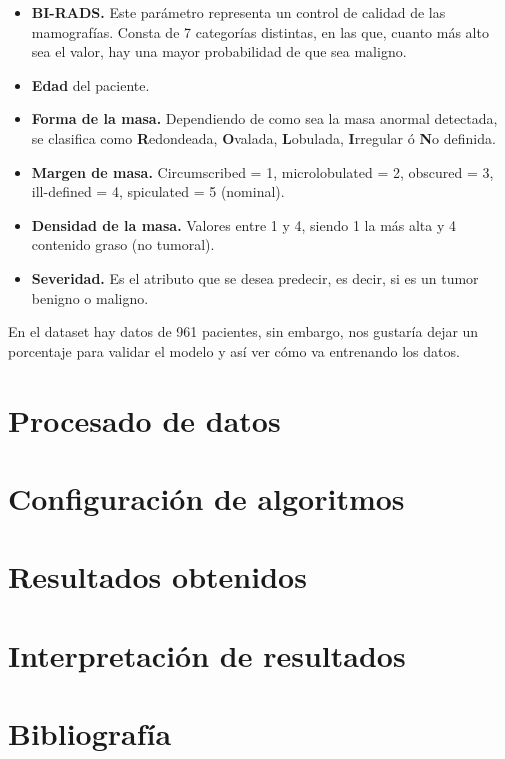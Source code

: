 \documentclass[11pt,a4paper]{article}
\begin{document}
\begin{itemize}
	\item \textbf{BI-RADS.} Este parámetro representa un control de calidad de las mamografías. Consta de 7 categorías distintas,
		  en las que, cuanto más alto sea el valor, hay una mayor probabilidad de que sea maligno.

	\item \textbf{Edad} del paciente.
	
	\item \textbf{Forma de la masa.} Dependiendo de como sea la masa anormal detectada, se clasifica como \textbf{R}edondeada,
		  \textbf{O}valada, \textbf{L}obulada, \textbf{I}rregular ó \textbf{N}o definida.

	\item \textbf{Margen de masa.} Circumscribed = 1, microlobulated = 2, obscured = 3, ill-defined = 4, spiculated = 5 (nominal).
	
	\item \textbf{Densidad de la masa.} Valores entre 1 y 4, siendo 1 la más alta y 4 contenido graso (no tumoral).
	
	\item \textbf{Severidad.} Es el atributo que se desea predecir, es decir, si es un tumor benigno o maligno.	

\end{itemize}

En el dataset hay datos de 961 pacientes, sin embargo, nos gustaría dejar un porcentaje para validar el modelo y así ver cómo va
entrenando los datos.



\section{Procesado de datos}


\section{Configuración de algoritmos}


\section{Resultados obtenidos}


\section{Interpretación de resultados}


\section{Bibliografía}
\end{document}
